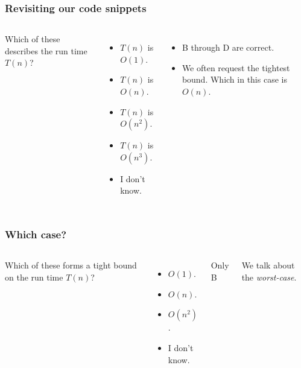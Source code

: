 \begin{frame}
	\frametitle{Revisiting our code snippets}
	
	
	\begin{columns}
		Which of these describes the run time $T(n)$?
	\begin{itemize}
		\item $T(n)$ is $O(1)$.
		\item $T(n)$ is $O(n)$. 
		\item $T(n)$ is $O(n^2)$. 
		\item $T(n)$ is $O(n^3)$. 
		\item I don't know.
	\end{itemize}	
	\begin{itemize}
		\item B through D are correct.
		\item We often request the tightest bound. Which in this case is $O(n)$.
	\end{itemize}	
		
	\end{columns}
\end{frame}

\begin{frame}
	\frametitle{Which case?}
	
	\begin{columns}
		\column{0.755\textwidth}

		Which of these forms a tight bound on the run time $T(n)$?
		
	\begin{itemize}
		\item $O(1)$. 
		\item $O(n)$. 
		\item $O(n^2)$. 
		\item I don't know.
	\end{itemize}	
		\column{0.255\textwidth}
		
			Only B
		
				We talk about the \textit{worst-case}.
	\end{columns}
	
	
	
\end{frame}


